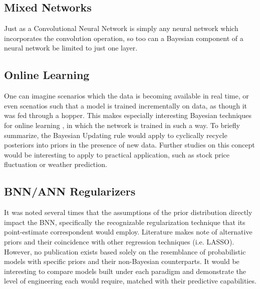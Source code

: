 \subsection{Mixed Networks}
Just as a Convolutional Neural Network is simply any neural network which incorporates the convolution operation, so too can a Bayesian component of a neural network be limited to just one layer.

\subsection{Online Learning}
One can imagine scenarios which the data is becoming available in real time, or even scenatios such that a model is trained incrementally on data, as though it was fed through a hopper.  This makes especially interesting Bayesian techniques for online learning \cite{opper1999bayesian}, in which the network is trained in such a way.  To briefly summarize, the Bayesian Updating rule would apply to cyclically recycle posteriors into priors in the presence of new data.  Further studies on this concept would be interesting to apply to practical application, such as stock price fluctuation or weather prediction.

\subsection{BNN/ANN Regularizers}
It was noted several times that the assumptions of the prior distribution directly impact the BNN, specifically the recognizable regularization technique that its point-estimate correspondent would employ.  Literature \cite{vladimirova2019understanding} \cite{chiuso2016regularization} makes note of alternative priors and their coincidence with other regression techniques (i.e. LASSO).  However, no publication exists based solely on the resemblance of probabilistic models with specific priors and their non-Bayesian counterparts.  It would be interesting to compare models built under each paradigm and demonstrate the level of engineering each would require, matched with their predictive capabilities.


